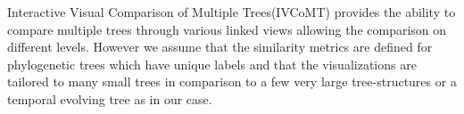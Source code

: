 Interactive Visual Comparison of Multiple Trees(IVCoMT\cite{bremm2011interactive}) provides the ability to compare multiple trees through various linked views allowing the comparison on different levels. However we assume that the similarity metrics are defined for phylogenetic trees which have unique labels and that the visualizations are tailored to many small trees in comparison to a few very large tree-structures or a temporal evolving tree as in our case.
